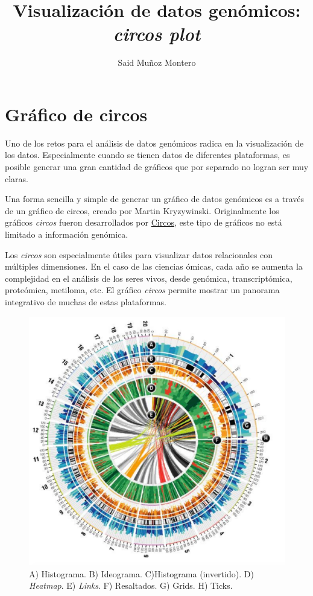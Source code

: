 \documentclass[a4paper,spanish]{article}
\title{Visualización de datos genómicos: \textit{circos plot}}
\author{Said Muñoz Montero}
\begin{document}


\maketitle

\section{Gráfico de circos}
Uno de los retos para el análisis de datos genómicos radica en la visualización de los datos. Especialmente cuando se tienen datos de diferentes plataformas, es posible generar una gran cantidad de gráficos que por separado no logran ser muy claras.

Una forma sencilla y simple de generar un gráfico de datos genómicos es a través de un gráfico de circos, creado por Martin Kryzywinski. Originalmente los gráficos \textit{circos} fueron desarrollados por \href{https://circos.ca/}{Circos}, este tipo de gráficos no está limitado a información genómica.\cite{krzywinski2009circos}

Los \textit{circos} son especialmente útiles para visualizar datos relacionales con múltiples dimensiones. En el caso de las ciencias ómicas, cada año se aumenta la complejidad en el análisis de los seres vivos, desde genómica, transcriptómica, proteómica, metiloma, etc. El gráfico \textit{circos} permite mostrar un panorama integrativo de muchas de estas plataformas.

\begin{figure}[H]
\centering
\includegraphics{circos_example}
\caption{A) Histograma. B) Ideograma. C)Histograma (invertido). D) \textit{Heatmap}. E) \textit{Links}. F) Resaltados. G) Grids. H) Ticks.}
\end{figure}
\end{document}
